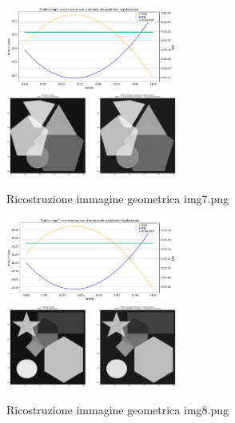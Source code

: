 \begin{figure}[H]
    \includegraphics[width=0.5\textwidth]{IMMAGINI_RELAZIONE/grafico7Tik.png}
    \includegraphics[width=0.5\textwidth]{IMMAGINI_RELAZIONE/ricostruzione7Tik.png}
    \caption{Ricostruzione immagine geometrica img7.png}

    \includegraphics[width=0.5\textwidth]{IMMAGINI_RELAZIONE/grafico8Tik.png}
    \includegraphics[width=0.5\textwidth]{IMMAGINI_RELAZIONE/ricostruzione8Tik.png}
    \caption{Ricostruzione immagine geometrica img8.png}
\end{figure}

